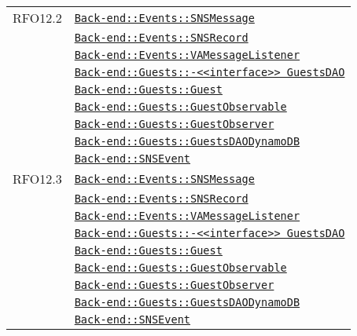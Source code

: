 \begin{longtable}{|>{\centering}m{3cm}|m{10cm}<{\centering}|}
RFO12.2 & \hyperref[Back-end::Events::SNSMessage]{\texttt{Back-end::Events::SNSMessage}}\\
& \hyperref[Back-end::Events::SNSRecord]{\texttt{Back-end::Events::SNSRecord}}\\
& \hyperref[Back-end::Events::VAMessageListener]{\texttt{Back-end::Events::VAMessageListener}}\\
& \hyperref[Back-end::Guests::<<interface>> GuestsDAO]{\texttt{Back-end::Guests::-\linebreak <<interface>> GuestsDAO}}\\
& \hyperref[Back-end::Guests::Guest]{\texttt{Back-end::Guests::Guest}}\\
& \hyperref[Back-end::Guests::GuestObservable]{\texttt{Back-end::Guests::GuestObservable}}\\
& \hyperref[Back-end::Guests::GuestObserver]{\texttt{Back-end::Guests::GuestObserver}}\\
& \hyperref[Back-end::Guests::GuestsDAODynamoDB]{\texttt{Back-end::Guests::GuestsDAODynamoDB}}\\
& \hyperref[Back-end::SNSEvent]{\texttt{Back-end::SNSEvent}}\\ \hline

RFO12.3 & \hyperref[Back-end::Events::SNSMessage]{\texttt{Back-end::Events::SNSMessage}}\\
& \hyperref[Back-end::Events::SNSRecord]{\texttt{Back-end::Events::SNSRecord}}\\
& \hyperref[Back-end::Events::VAMessageListener]{\texttt{Back-end::Events::VAMessageListener}}\\
& \hyperref[Back-end::Guests::<<interface>> GuestsDAO]{\texttt{Back-end::Guests::-\linebreak <<interface>> GuestsDAO}}\\
& \hyperref[Back-end::Guests::Guest]{\texttt{Back-end::Guests::Guest}}\\
& \hyperref[Back-end::Guests::GuestObservable]{\texttt{Back-end::Guests::GuestObservable}}\\
& \hyperref[Back-end::Guests::GuestObserver]{\texttt{Back-end::Guests::GuestObserver}}\\
& \hyperref[Back-end::Guests::GuestsDAODynamoDB]{\texttt{Back-end::Guests::GuestsDAODynamoDB}}\\
& \hyperref[Back-end::SNSEvent]{\texttt{Back-end::SNSEvent}}\\ \hline


\end{longtable}
